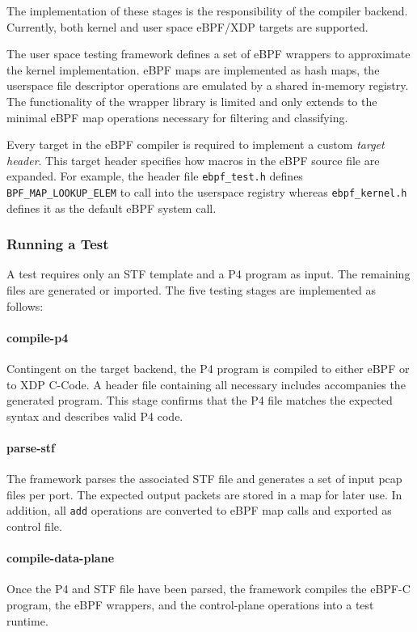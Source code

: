 The implementation of these stages is the responsibility of the compiler 
backend.
Currently, both kernel and user space eBPF/XDP targets are supported.

The user space testing framework defines a set of eBPF wrappers to approximate 
the kernel implementation. eBPF maps are implemented as hash maps, the 
userspace file descriptor operations are emulated by a shared in-memory 
registry. 
The functionality of the wrapper library is limited and only extends to the 
minimal eBPF map operations necessary for filtering and classifying.

Every target in the eBPF compiler is required to implement a custom 
\textit{target header}. This target header specifies how macros in the eBPF 
source file are expanded. For example, the header file \texttt{ebpf\_test.h} 
defines \texttt{BPF\_MAP\_LOOKUP\_ELEM} to call into the userspace registry 
whereas \texttt{ebpf\_kernel.h} defines it as the default eBPF system call.

\subsubsection{Running a Test}
A test requires only an STF template and a P4 program as input. The 
remaining files are generated or imported. The five testing stages are 
implemented as follows:

\paragraph{compile-p4}
Contingent on the target backend, the P4 program is compiled to either eBPF or 
to XDP C-Code. A header file containing all necessary includes accompanies the 
generated program. This stage confirms that the P4 file matches the expected 
syntax and describes valid P4 code.

\paragraph{parse-stf}
The framework parses the associated STF file and generates a set of input pcap 
files per port. The expected output packets are stored in a map for later use. 
In addition, all \texttt{add} operations are converted to eBPF map calls and 
exported as control file.

\paragraph{compile-data-plane}
Once the P4 and STF file have been parsed, the framework compiles 
the eBPF-C program, the eBPF wrappers, and the control-plane operations into a 
test runtime.

